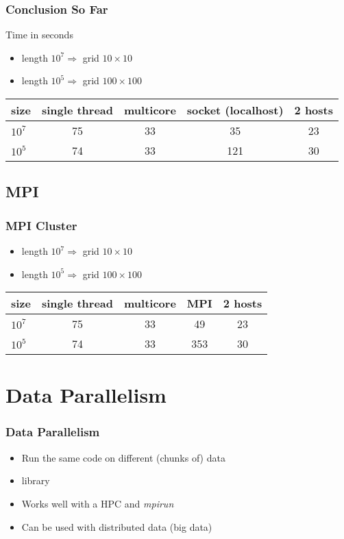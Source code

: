 \documentclass[pdftex]{beamer}
\begin{document}
\begin{frame}
  \frametitle{Conclusion So Far}
  Time in seconds
  \begin{itemize}
  \item length $10^{7} \Rightarrow$ grid $10\times10$
  \item length $10^{5} \Rightarrow$ grid $100\times100$
  \end{itemize}
  \begin{tabular}{l cccc}
    \toprule
    size      & single thread & multicore & socket (localhost) & 2 hosts\\
    \midrule
    $10^{7}$  & 75            & 33        & 35                 & 23\\
    $10^{5}$  & 74            & 33        & 121                & 30\\
    \bottomrule
  \end{tabular}
\end{frame}



\subsection{MPI}

\begin{frame}
  \frametitle{MPI Cluster}
  \begin{itemize}
  \item length $10^{7} \Rightarrow$ grid $10\times10$
  \item length $10^{5} \Rightarrow$ grid $100\times100$
  \end{itemize}
  \begin{tabular}{l cccc}
    \toprule
    size      & single thread & multicore & MPI & 2 hosts\\
    \midrule
    $10^{7}$  & 75            & 33        & 49                 & 23\\
    $10^{5}$  & 74            & 33        & 353                & 30\\
    \bottomrule
  \end{tabular}
\end{frame}

\section{Data Parallelism}

\begin{frame}
  \frametitle{Data Parallelism}
  \begin{itemize}
  \item Run the same code on different (chunks of) data
  \item {} library
  \item Works well with a HPC and \emph{mpirun}
  \item Can be used with distributed data (big data)
  \end{itemize}
\end{frame}
\end{document}
